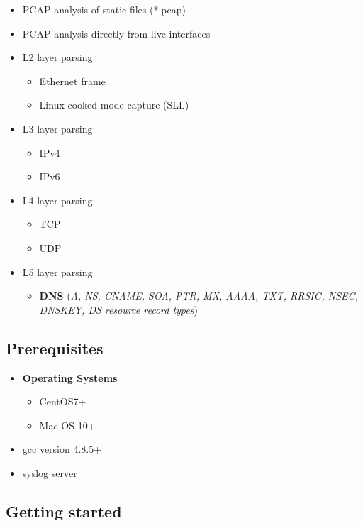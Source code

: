 \begin{itemize}
\item PCAP analysis of static files (*.pcap)
\item PCAP analysis directly from live interfaces
\item L2 layer parsing
    \begin{itemize}
    \item Ethernet frame
    \item Linux cooked-mode capture (SLL)
    \end{itemize}
\item L3 layer parsing
    \begin{itemize}
    \item IPv4
    \item IPv6
    \end{itemize}
\item L4 layer parsing
    \begin{itemize}
    \item TCP
    \item UDP
    \end{itemize}
\item L5 layer parsing 
    \begin{itemize}
    \item \textbf{DNS} (\textit{A, NS, CNAME, SOA, PTR, MX, AAAA, TXT, RRSIG, NSEC, DNSKEY, DS resource record types})
    \end{itemize}
\end{itemize} 
\subsection{Prerequisites}

\begin{itemize}

\item \textbf{Operating Systems}
    \begin{itemize}
    \item CentOS7+
    \item Mac OS 10+
    \end{itemize}
\item gcc version 4.8.5+
\item syslog server

\end{itemize}


\subsection{Getting started}

